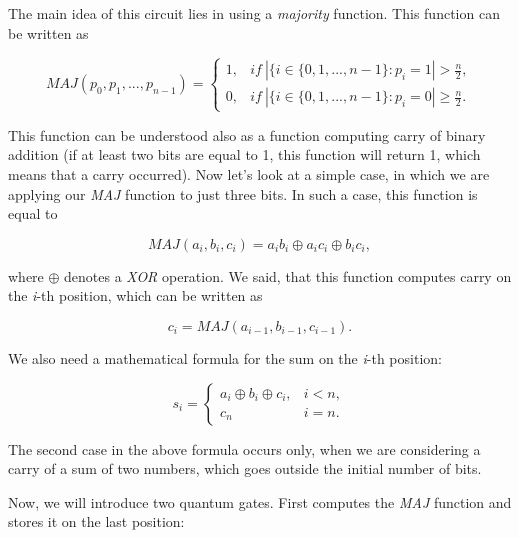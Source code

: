 The main idea of this circuit lies in using a \textit{majority} function. This function can be written as

\[ MAJ(p_0, p_1, ..., p_{n-1}) = \begin{cases} 
1, & if\ |\{i \in \{0, 1, ..., n-1\}: p_i = 1| > \frac{n}{2}, \\
0, & if\ |\{i \in \{0, 1, ..., n-1\}: p_i = 0| \geq \frac{n}{2}.
\end{cases}\]

This function can be understood also as a function computing carry of binary addition (if at least two bits are equal to 1, this function will return 1, which means that a carry occurred). Now let's look at a simple case, in which we are applying our \textit{MAJ} function to just three bits. In such a case, this function is equal to

\[ MAJ(a_i, b_i, c_i) = a_i b_i \oplus a_i c_i \oplus b_i c_i,\]

where $\oplus$ denotes a \textit{XOR} operation. We said, that this function computes carry on the \textit{i}-th position, which can be written as

\[ c_i = MAJ(a_{i - 1}, b_{i - 1}, c_{i - 1}).\]

We also need a mathematical formula for the sum on the \textit{i}-th position:

\[ s_i = \begin{cases} 
a_i \oplus b_i \oplus c_i, & i < n, \\
c_n & i = n. \end{cases}\]

The second case in the above formula occurs only, when we are considering a carry of a sum of two numbers, which goes outside the initial number of bits.

Now, we will introduce two quantum gates. First computes the \textit{MAJ} function and stores it on the last position:

\begin{table}[ht]
\centering
{}
\label{my-label}
\end{table}

